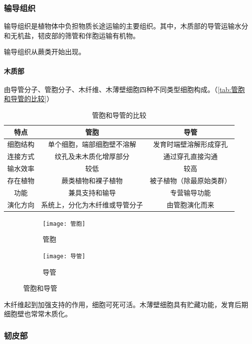 \subsubsection{输导组织}

输导组织是植物体中负担物质长途运输的主要组织。其中，木质部的导管运输水分和无机盐，韧皮部的筛管和伴胞运输有机物。

输导组织从蕨类开始出现。

\paragraph{木质部}

由导管分子、管胞分子、木纤维、木薄壁细胞四种不同类型细胞构成。（\autoref{tab:管胞和导管的比较}）

\begin{table}[htbp]
	\centering
	\begin{tabularx}{\textwidth}{|c|C|c|}
		\hline
		特点 & 管胞 & 导管 \\ \hline
		细胞结构 & 单个细胞，端部细胞壁不溶解 & 发育时端壁溶解形成穿孔 \\ \hline
		连接方式 & 纹孔及未木质化增厚部分 & 通过穿孔直接沟通 \\ \hline
		输水效率 & 较低 & 较高 \\ \hline
		存在植物 & 蕨类植物和裸子植物 & 被子植物（除最原始类群） \\ \hline
		功能 & 兼具支持和输导 & 专营输导功能 \\ \hline
		演化方向 & 系统上，分化为木纤维或导管分子 & 由管胞演化而来 \\ \hline
	\end{tabularx}
	\caption{管胞和导管的比较}
	\label{tab:管胞和导管的比较}
\end{table}

\begin{figure}[htbp]
	\centering
	\begin{subfigure}{0.6\textwidth}
		\texttt{[image: 管胞]}
		\caption{管胞}
	\end{subfigure}

	\begin{subfigure}{0.45\textwidth}
		\texttt{[image: 导管]}
		\caption{导管}
	\end{subfigure}
	\caption{管胞和导管}
	\label{fig:管胞和导管}
\end{figure}

木纤维起到加强支持的作用，细胞可死可活。木薄壁细胞具有贮藏功能，发育后期细胞壁也常常木质化。

\subsubsection{韧皮部}

